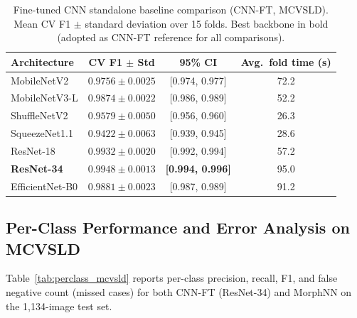 \documentclass[preprint,12pt]{elsarticle}
\begin{document}
\begin{table}[htbp]
\centering
\caption{Fine-tuned CNN standalone baseline comparison (CNN-FT, MCVSLD).
  Mean CV F1 $\pm$ standard deviation over 15 folds.
  Best backbone in bold (adopted as CNN-FT reference for all comparisons).}
\label{tab:backbone}
\renewcommand{\arraystretch}{1.1}
\begin{tabular}{lccc}
\toprule
\textbf{Architecture} & \textbf{CV F1 $\pm$ Std} & \textbf{95\% CI} &
  \textbf{Avg.\ fold time (s)} \\
\midrule
MobileNetV2        & $0.9756 \pm 0.0025$ & [0.974, 0.977] & 72.2 \\
MobileNetV3-L      & $0.9874 \pm 0.0022$ & [0.986, 0.989] & 52.2 \\
ShuffleNetV2       & $0.9579 \pm 0.0050$ & [0.956, 0.960] & 26.3 \\
SqueezeNet1.1      & $0.9422 \pm 0.0063$ & [0.939, 0.945] & 28.6 \\
ResNet-18          & $0.9932 \pm 0.0020$ & [0.992, 0.994] & 57.2 \\
\textbf{ResNet-34} & $\bm{0.9948 \pm 0.0013}$ & \textbf{[0.994, 0.996]} & 95.0 \\
EfficientNet-B0    & $0.9881 \pm 0.0023$ & [0.987, 0.989] & 91.2 \\
\bottomrule
\end{tabular}
\end{table}


\subsection{Per-Class Performance and Error Analysis on MCVSLD}
\label{sec:perclass}

Table~\ref{tab:perclass_mcvsld} reports per-class precision, recall,
F1, and false negative count (missed cases) for both CNN-FT (ResNet-34)
and MorphNN on the 1,134-image test set.
\end{document}
